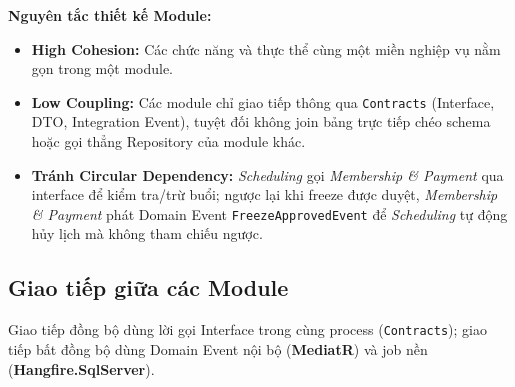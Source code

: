 \documentclass[a4paper,12pt]{article}
\begin{document}
\textbf{Nguyên tắc thiết kế Module:}
\begin{itemize}
    \item \textbf{High Cohesion:} Các chức năng và thực thể cùng một miền nghiệp vụ nằm gọn trong một module.
    \item \textbf{Low Coupling:} Các module chỉ giao tiếp thông qua \texttt{Contracts} (Interface, DTO, Integration Event), tuyệt đối không join bảng trực tiếp chéo schema hoặc gọi thẳng Repository của module khác.
    \item \textbf{Tránh Circular Dependency:} \textit{Scheduling} gọi \textit{Membership \& Payment} qua interface để kiểm tra/trừ buổi; ngược lại khi freeze được duyệt, \textit{Membership \& Payment} phát Domain Event \texttt{FreezeApprovedEvent} để \textit{Scheduling} tự động hủy lịch mà không tham chiếu ngược.
\end{itemize}

\subsection{Giao tiếp giữa các Module}
Giao tiếp đồng bộ dùng lời gọi Interface trong cùng process (\texttt{Contracts}); giao tiếp bất đồng bộ dùng Domain Event nội bộ (\textbf{MediatR}) và job nền (\textbf{Hangfire.SqlServer}).
\end{document}
